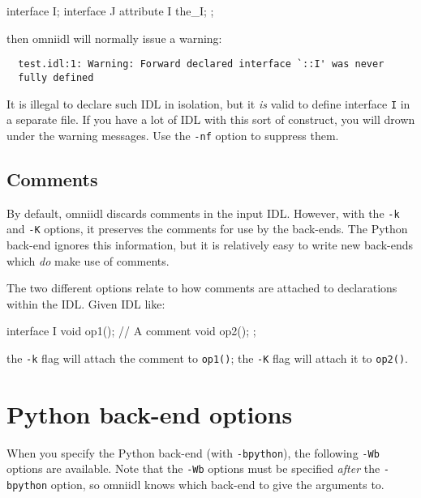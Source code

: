 \documentclass[draft,11pt,twoside,a4paper]{book}
\newcommand{\intf}[1]{\texttt{#1}}
\newcommand{\op}[1]{\texttt{#1()}}
\newcommand{\cmdline}[1]{\texttt{#1}}
\begin{document}
\begin{idllisting}
interface I;
interface J {
  attribute I the_I;
};
\end{idllisting}

\noindent then omniidl will normally issue a warning:

{\small
\begin{verbatim}
  test.idl:1: Warning: Forward declared interface `::I' was never
  fully defined
\end{verbatim}
}

\noindent It is illegal to declare such IDL in isolation, but it
\emph{is} valid to define interface \intf{I} in a separate file. If
you have a lot of IDL with this sort of construct, you will drown
under the warning messages. Use the \cmdline{-nf} option to suppress
them.


\subsection{Comments}

By default, omniidl discards comments in the input IDL. However, with
the \cmdline{-k} and \cmdline{-K} options, it preserves the comments
for use by the back-ends. The Python back-end ignores this
information, but it is relatively easy to write new back-ends which
\emph{do} make use of comments.

The two different options relate to how comments are attached to
declarations within the IDL. Given IDL like:

\begin{idllisting}
interface I {
  void op1();
  // A comment
  void op2();
};
\end{idllisting}

\noindent the \cmdline{-k} flag will attach the comment to \op{op1};
the \cmdline{-K} flag will attach it to \op{op2}.



\section{Python back-end options}
\label{sec:Wbglobal}

When you specify the Python back-end (with \cmdline{-bpython}), the
following \cmdline{-Wb} options are available. Note that the
\cmdline{-Wb} options must be specified \emph{after} the
\cmdline{-bpython} option, so omniidl knows which back-end to give the
arguments to.
\end{document}
